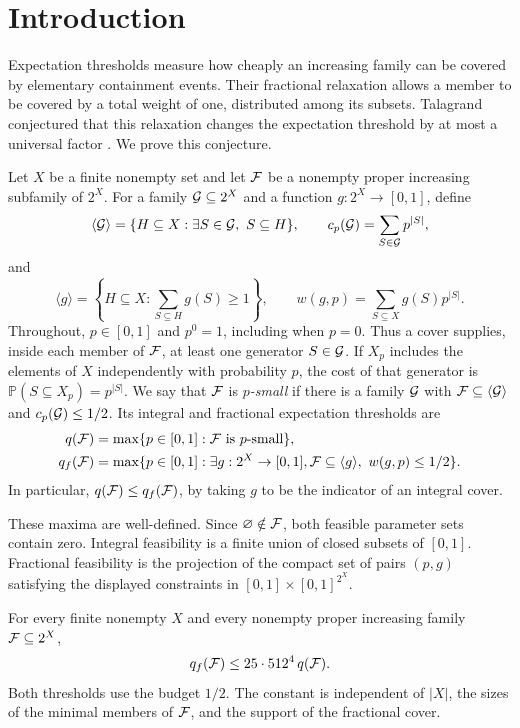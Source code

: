 \section{Introduction}

Expectation thresholds measure how cheaply an increasing family can be
covered by elementary containment events. Their fractional relaxation
allows a member to be covered by a total weight of one, distributed
among its subsets. Talagrand conjectured that this relaxation changes
the expectation threshold by at most a universal factor
\cite[Conjecture~6.3]{Talagrand2010}. We prove this conjecture.

Let $X$ be a finite nonempty set and let $\mathcal F$ be a nonempty proper
increasing subfamily of $2^X$. For a family $\mathcal G\subseteq2^X$ and a
function $g:2^X\to[0,1]$, define
\[
 \langle\mathcal G\rangle
 =\{H\subseteq X:\exists S\in\mathcal G,\ S\subseteq H\},
 \qquad
 c_p(\mathcal G)=\sum_{S\in\mathcal G}p^{|S|},
\]
and
\[
 \langle g\rangle
 =\left\{H\subseteq X:\sum_{S\subseteq H}g(S)\ge1\right\},
 \qquad
 w(g,p)=\sum_{S\subseteq X}g(S)p^{|S|}.
\]
Throughout, $p\in[0,1]$ and $p^0=1$, including when $p=0$.
Thus a cover supplies, inside each member of $\mathcal F$, at least one
generator $S\in\mathcal G$. If $X_p$ includes the elements of $X$ independently
with probability $p$, the cost of that generator is
$\mathbb P(S\subseteq X_p)=p^{|S|}$.
We say that $\mathcal F$ is \emph{$p$-small} if there is a family $\mathcal G$ with
$\mathcal F\subseteq\langle\mathcal G\rangle$ and $c_p(\mathcal G)\le1/2$.
Its integral and fractional expectation thresholds are
\begin{align*}
 q(\mathcal F)
 &=\max\{p\in[0,1]:\mathcal F\text{ is }p\text{-small}\},\\
 q_f(\mathcal F)
 &=\max\{p\in[0,1]:\exists g:2^X\to[0,1],
       \mathcal F\subseteq\langle g\rangle,
       \ w(g,p)\le1/2\}.
\end{align*}
In particular, $q(\mathcal F)\le q_f(\mathcal F)$, by taking $g$ to be the indicator
of an integral cover.

These maxima are well-defined. Since $\varnothing\notin\mathcal F$, both
feasible parameter sets contain zero. Integral feasibility is a finite
union of closed subsets of $[0,1]$. Fractional feasibility is the
projection of the compact set of pairs $(p,g)$ satisfying the displayed
constraints in $[0,1]\times[0,1]^{2^X}$.

\begin{theorem}\label{thm:main}
For every finite nonempty $X$ and every nonempty proper increasing
family $\mathcal F\subseteq2^X$,
\[
 q_f(\mathcal F)\le25\cdot512^4\,q(\mathcal F).
\]
Both thresholds use the budget $1/2$. The constant is independent of
$|X|$, the sizes of the minimal members of $\mathcal F$, and the support of
the fractional cover.
\end{theorem}

